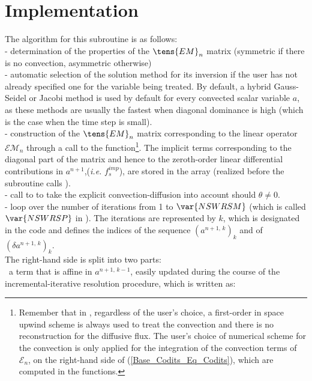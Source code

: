 \section*{Implementation}
The algorithm for this subroutine is as follows:\\
- determination of the properties of the $\tens{EM}_{n}$ matrix (symmetric
if there is no convection, asymmetric otherwise)\\
- automatic selection of the solution method for its inversion if the user has not already
specified one for the variable being treated. By default, a hybrid Gauss-Seidel or Jacobi method is used by default for every convected scalar variable $a$, as these methods are usually the fastest when diagonal dominance is high (which is the case when the time step is small).\\
- construction of the $\tens{EM}_{n}$ matrix corresponding to the linear operator $\mathcal{EM}_{n}$ through a call to the
 function\footnote{Remember that in , regardless of the user's choice, a first-order in space upwind scheme is always used to treat the convection and there is no reconstruction for
the diffusive flux. The user's choice of numerical scheme for the convection is only applied for the integration
of the convection terms of $\mathcal{E}_{n}$, on the right-hand side of
(\ref{Base_Codits_Eq_Codits}), which are computed in the  functions.}. The implicit terms corresponding to the diagonal part of the matrix and hence to the zeroth-order linear differential contributions in $a^{n+1}$,({\it i.e.} $f_s^{imp}$), are stored in the array  (realized before the subroutine calls ).\\
- call to  to take the explicit convection-diffusion into account should
 $\theta \ne 0$.\\
- loop over the number of iterations from 1 to $\var{NSWRSM}$ (which is called $\var{NSWRSP}$ in ).
The iterations are represented by $k$, which is designated  in the code and defines the indices of the sequence $(a^{n+1,\,k})_k$ and of $(\delta a^{n+1,\,k})_k$.\\
The right-hand side is split into two parts:\\
\hspace*{1cm}{\tiny$\blacksquare$}\ a term that is affine in $a^{n+1,\,k-1}$, easily updated during the course of the incremental-iterative resolution procedure, which is written as:
